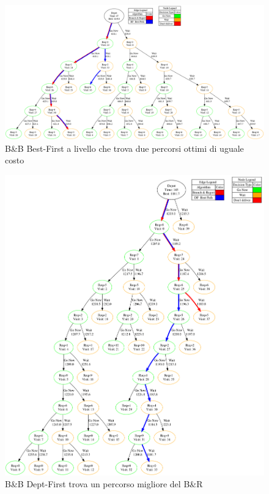 \documentclass[
    article,            %
    12pt,                %
    oneside,            %
    a4paper,            %
    english,            %
    italian,                %
    sumario=tradicional,
]{abntex2}
\begin{document}
\newpage{}
\vspace*{\fill}
\begin{figure}[h!]
    \centering
    \includegraphics[width=1.0\textwidth]{Images/raro.png}
    \caption{B\&B Best-First a livello che trova due percorsi ottimi di uguale costo}
    \label{fig:BBBFduepath}
\end{figure}
\vspace*{\fill}
\newpage{}
\vspace*{\fill}
\begin{figure}[h!]
    \centering
    \includegraphics[width=1.0\textwidth]{Images/good_shit.png}
    \caption{B\&B Dept-First trova un percorso migliore del B\&R}
    \label{fig:BBDFmigliore}
\end{figure}
\vspace*{\fill}
\end{document}
